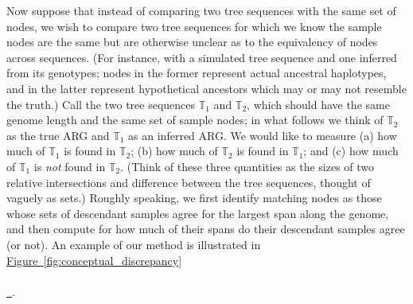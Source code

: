 \documentclass[10pt,twoside,lineno]{gsajnl}
\newcommand{\T}{\mathbb{T}}
\newcommand*{\figref}[2][]{%
	\hyperref[{#2}]{%
		Figure~\ref*{#2}%
		\ifx\\#1\\%
		\else
		\,#1%
		\fi
	}%
}
\begin{document}
Now suppose that instead of comparing two tree sequences with the same set of nodes,
we wish to compare two tree sequences for which we know the sample nodes are the same
but are otherwise unclear as to the equivalency of nodes across sequences.
(For instance, with a simulated tree sequence and one inferred from its genotypes;
nodes in the former represent actual ancestral haplotypes, and in the latter
represent hypothetical ancestors which may or may not resemble the truth.)
Call the two tree sequences $\T_1$ and $\T_2$, which should have the same genome length
and the same set of sample nodes;
in what follows we think of $\T_2$ as the true ARG and $\T_1$ as an inferred ARG.
We would like to measure (a) how much of $\T_1$ is found in $\T_2$;
(b) how much of $\T_2$ is found in $\T_1$; and
(c) how much of $\T_1$ is \emph{not} found in $\T_2$.
(Think of these three quantities as the sizes of two relative intersections
and difference between the tree sequences,
thought of vaguely as sets.)
Roughly speaking, we first identify matching nodes
as those whose sets of descendant samples agree for the largest span along the genome,
and then compute for how much of their spans do their descendant samples agree (or not).
An example of our method is illustrated in \figref{fig:conceptual_discrepancy}.
\end{document}
